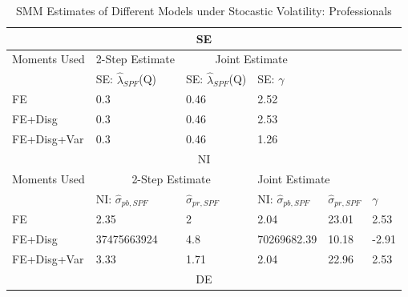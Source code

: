 \documentclass[12pt]{article}
\begin{document}
\begin{table}[p]
		\centering
		\caption{SMM Estimates of Different Models under Stocastic Volatility: Professionals}
	\label{SMM_Est_sv_SPF}
	\begin{tabular}{llllll}
			\hline 
		\multicolumn{6}{c}{SE}                                                                                                                         \\
			\hline 
		Moments Used & \multicolumn{1}{c}{2-Step Estimate} & \multicolumn{2}{c}{Joint Estimate}                     &                       &          \\
			\hline 
		& SE: $\hat\lambda_{SPF}$(Q)          & SE: $\hat\lambda_{SPF}$(Q) & SE: $\gamma$              &                       &          \\
			\hline 
		FE        & 0.3                                 & 0.46                       & 2.52                      &                       &          \\
		FE+Disg      & 0.3                                 & 0.46                       & 2.53                      &                       &          \\
		FE+Disg+Var  & 0.3                                 & 0.46                       & 1.26                      &                       &          \\
			\hline 
		\multicolumn{6}{c}{NI}                                                                                                                         \\
			\hline 
		Moments Used & \multicolumn{2}{c}{2-Step Estimate}                              & \multicolumn{3}{l}{Joint Estimate}                           \\
			\hline 
		& NI: $\hat\sigma_{pb,SPF}$           & $\hat\sigma_{pr,SPF}$      & NI: $\hat\sigma_{pb,SPF}$ & $\hat\sigma_{pr,SPF}$ & $\gamma$ \\
			\hline 
		FE       & 2.35                                & 2                          & 2.04                      & 23.01                 & 2.53     \\
		FE+Disg      & 37475663924                         & 4.8                        & 70269682.39               & 10.18                 & -2.91    \\
		FE+Disg+Var  & 3.33                                & 1.71                       & 2.04                      & 22.96                 & 2.53     \\
			\hline 
		\multicolumn{6}{c}{DE}                                                                                                                         \\

\end{tabular}
\end{table}
\end{document}
